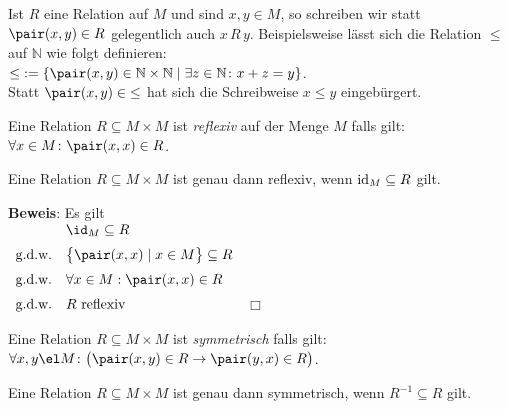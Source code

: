 Ist $R$ eine Relation auf $M$ und sind $x, y \in M$, so schreiben wir statt
$\pair(x,y) \in R$ gelegentlich auch $x\, R\, y$.  Beispielsweise lässt sich die Relation $\leq$ 
auf $\mathbb{N}$ wie folgt definieren: \\[0.2cm]
\hspace*{1.3cm}
 $\leq\; := \{ \pair(x,y) \in \mathbb{N} \times \mathbb{N} \mid \exists z \in \mathbb{N} \colon x + z = y \}$.
\\[0.2cm]
Statt $\pair(x,y) \in\; \leq$ hat sich die Schreibweise $x \leq y$ eingebürgert.
  
\begin{Definition} 
Eine Relation $R \subseteq M \times M$  ist \emph{reflexiv} auf der Menge $M$ falls gilt: \\[0.2cm]
\hspace*{1.3cm} $\forall x\in M \colon \pair(x,x) \in R$. 
\end{Definition}

\begin{Satz}
Eine Relation $R \subseteq M \times M$ ist genau dann reflexiv, wenn $\mbox{\rm id}_M \subseteq R$ gilt.
\end{Satz}

\noindent
\textbf{Beweis}: Es gilt
\\[0.2cm]
\hspace*{1.3cm}
$
\begin{array}[b]{cl}
              & \id_M \subseteq R \\[0.2cm]
\mbox{g.d.w.} & \bigl\{ \pair(x,x) \mid x \in M \bigr\} \subseteq R \\[0.2cm] 
\mbox{g.d.w.} & \forall x \in M: \pair(x,x) \in R \\[0.2cm] 
\mbox{g.d.w.} & \mbox{$R$ reflexiv}  
\end{array}
$
\hspace*{\fill} $\Box$

\begin{Definition}
Eine Relation $R \subseteq M \times M$  ist \emph{symmetrisch} falls gilt: \\[0.2cm]
\hspace*{1.3cm} 
$\forall x,y\el M \colon \bigl(\pair(x,y) \in R \rightarrow\pair(y,x)\in R\bigr)$. 
\end{Definition}

\begin{Satz}
Eine Relation $R \subseteq M \times M$ ist genau dann symmetrisch, wenn $R^{-1} \subseteq R$ gilt.
\end{Satz}

